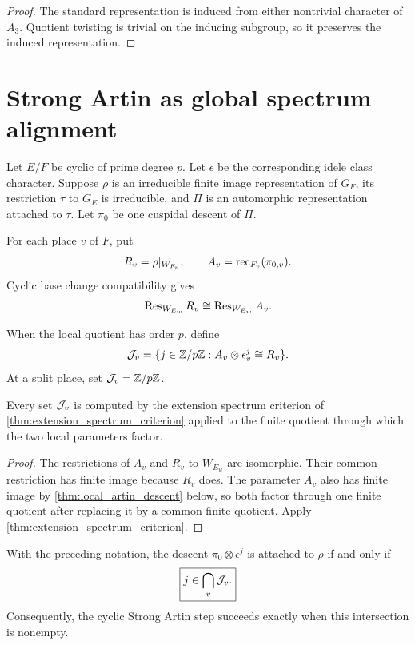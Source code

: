 \begin{proof}
The standard representation is induced from either nontrivial character of \(A_3\). Quotient twisting is trivial on the inducing subgroup, so it preserves the induced representation.
\end{proof}

\section{Strong Artin as global spectrum alignment}\label{sec:global_alignment}

Let \(E/F\) be cyclic of prime degree \(p\). Let \(\epsilon\) be the corresponding idele class character. Suppose \(\rho\) is an irreducible finite image representation of \(G_F\), its restriction \(\tau\) to \(G_E\) is irreducible, and \(\Pi\) is an automorphic representation attached to \(\tau\). Let \(\pi_0\) be one cuspidal descent of \(\Pi\).

For each place \(v\) of \(F\), put
\[
 R_v=\rho|_{W_{F_v}},
 \qquad
 A_v=\operatorname{rec}_{F_v}(\pi_{0,v}).
\]
Cyclic base change compatibility gives
\[
 \operatorname{Res}_{W_{E_w}}R_v
 \cong
 \operatorname{Res}_{W_{E_w}}A_v.
\]

\begin{definition}\label{def:local_attachment_set}
When the local quotient has order \(p\), define
\[
 \mathcal J_v
 =
 \{j\in\mathbb Z/p\mathbb Z:
 A_v\otimes\epsilon_v^j\cong R_v\}.
\]
At a split place, set \(\mathcal J_v=\mathbb Z/p\mathbb Z\).
\end{definition}

\begin{theorem}\label{thm:local_attachment_spectrum}
Every set \(\mathcal J_v\) is computed by the extension spectrum criterion of \cref{thm:extension_spectrum_criterion} applied to the finite quotient through which the two local parameters factor.
\end{theorem}

\begin{proof}
The restrictions of \(A_v\) and \(R_v\) to \(W_{E_w}\) are isomorphic. Their common restriction has finite image because \(R_v\) does. The parameter \(A_v\) also has finite image by \cref{thm:local_artin_descent} below, so both factor through one finite quotient after replacing it by a common finite quotient. Apply \cref{thm:extension_spectrum_criterion}.
\end{proof}

\begin{theorem}\label{thm:global_attachment_criterion}
With the preceding notation, the descent \(\pi_0\otimes\epsilon^j\) is attached to \(\rho\) if and only if
\[
 \boxed{
 j\in\bigcap_v\mathcal J_v.
 }
\]
Consequently, the cyclic Strong Artin step succeeds exactly when this intersection is nonempty.
\end{theorem}

